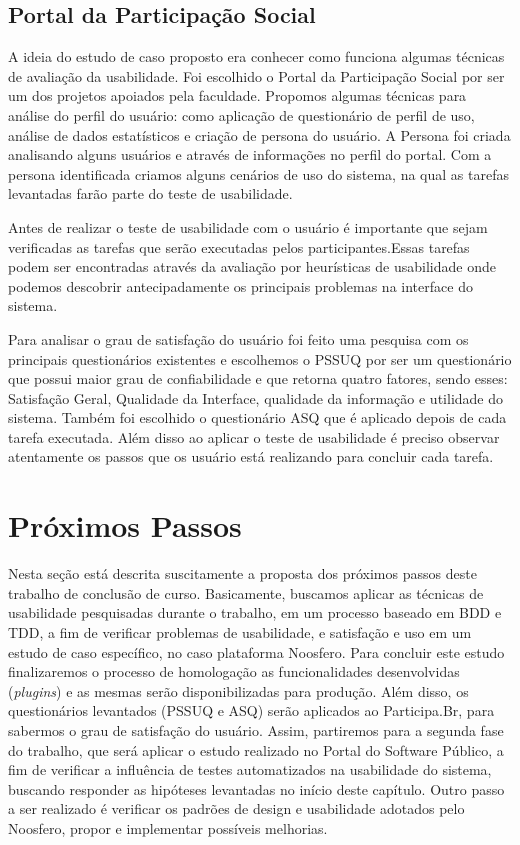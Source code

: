 \subsection{Portal da Participação Social} 

A ideia do estudo de caso proposto era conhecer como funciona algumas técnicas de avaliação da usabilidade. Foi escolhido o Portal da Participação Social por ser um dos projetos apoiados pela faculdade.
%
Propomos algumas técnicas para análise do perfil do usuário: como aplicação de questionário de perfil de uso, análise de dados estatísticos e criação de persona do usuário.
%
A Persona foi criada analisando alguns usuários e através de informações no perfil do portal.
%
Com a persona identificada criamos alguns cenários de uso do sistema, na qual as tarefas levantadas farão parte do teste de usabilidade.

Antes de realizar o teste de usabilidade com o usuário é importante que sejam verificadas as tarefas que serão executadas pelos participantes.Essas tarefas podem ser encontradas através da avaliação por heurísticas de usabilidade onde podemos descobrir antecipadamente os principais problemas na interface do sistema.

Para analisar o grau de satisfação do usuário foi feito uma pesquisa com os principais questionários existentes e escolhemos o PSSUQ por ser um questionário que possui maior grau de confiabilidade e que retorna quatro fatores, sendo esses: Satisfação Geral, Qualidade da Interface, qualidade da informação e utilidade do sistema.
%
Também foi escolhido o questionário ASQ que é aplicado depois de cada tarefa executada. Além disso ao aplicar o teste de usabilidade é preciso observar atentamente os passos que os usuário está realizando para concluir cada tarefa.


\section{Próximos Passos}

Nesta seção está descrita suscitamente a proposta dos próximos passos deste trabalho de conclusão de curso. Basicamente, buscamos aplicar as técnicas de usabilidade pesquisadas durante o trabalho, em um processo baseado em BDD e TDD, a fim de verificar problemas de usabilidade, e satisfação e uso em um estudo de caso específico, no caso plataforma Noosfero. 
%
Para concluir este estudo finalizaremos  o processo de  homologação as funcionalidades desenvolvidas (\textit{plugins}) e as mesmas serão disponibilizadas para produção.
%
Além disso, os questionários levantados (PSSUQ e ASQ) serão aplicados ao Participa.Br, para sabermos o grau de satisfação do usuário. 
%
Assim, partiremos para a segunda fase do trabalho, que será aplicar o estudo realizado  no Portal do Software Público, a fim de verificar a influência de testes automatizados na usabilidade do sistema, buscando responder as hipóteses levantadas no início deste capítulo. Outro passo a ser realizado é verificar os padrões de design e usabilidade adotados pelo Noosfero, propor e implementar possíveis melhorias.

